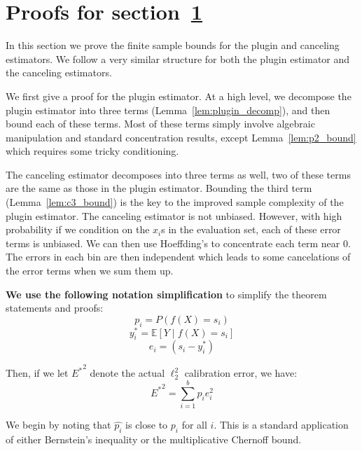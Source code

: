 \newpage

\section{Proofs for section~\ref{sec:verifying_calibration}}
\label{sec:verifying_calibration}

In this section we prove the finite sample bounds for the plugin and canceling estimators. We follow a very similar structure for both the plugin estimator and the canceling estimators.

We first give a proof for the plugin estimator. At a high level, we decompose the plugin estimator into three terms (Lemma~\ref{lem:plugin_decomp}), and then bound each of these terms. Most of these terms simply involve algebraic manipulation and standard concentration results, except Lemma~\ref{lem:p2_bound} which requires some tricky conditioning.

The canceling estimator decomposes into three terms as well, two of these terms are the same as those in the plugin estimator. Bounding the third term (Lemma~\ref{lem:c3_bound}) is the key to the improved sample complexity of the plugin estimator. The canceling estimator is not unbiased. However, with high probability if we condition on the $x_i$s in the evaluation set, each of these error terms is unbiased. We can then use Hoeffding's to concentrate each term near 0. The errors in each bin are then independent which leads to some cancelations of the error terms when we sum them up.

\textbf{We use the following notation simplification} to simplify the theorem statements and proofs:
\[ p_i = P(f(X) = s_i) \]
\[ y_i^* = \mathbb{E}[Y \; | \; f(X) = s_i] \]
\[ e_i = (s_i - y_i^*) \]

Then, if we let ${E^*}^2$ denote the actual $\ell_2^2$ calibration error, we have:
\[ {E^*}^2 = \sum_{i=1}^b p_i e_i^2 \]


We begin by noting that $\hat{p_i}$ is close to $p_i$ for all $i$. This is a standard application of either Bernstein's inequality or the multiplicative Chernoff bound.

